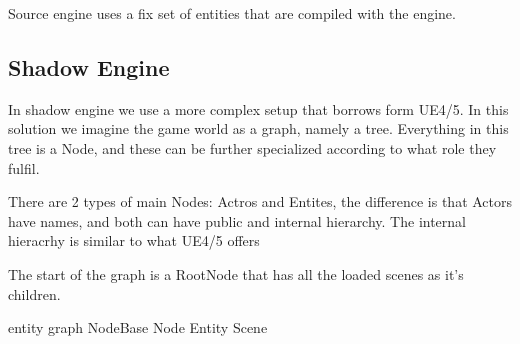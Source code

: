 Source engine uses a fix set of entities that are compiled with the engine.

\subsection{Shadow Engine}
In shadow engine we use a more complex setup that borrows form UE4/5.
In this solution we imagine the game world as a graph, namely a tree.
Everything in this tree is a Node, and these can be further specialized according to what role they fulfil.

There are 2 types of main Nodes: Actros and Entites, the difference is that Actors have names, and both can have public and internal hierarchy.
The internal hieracrhy is similar to what UE4/5 offers

The start of the graph is a RootNode that has all the loaded scenes as it's children.

entity graph
NodeBase
Node
Entity
Scene
	 